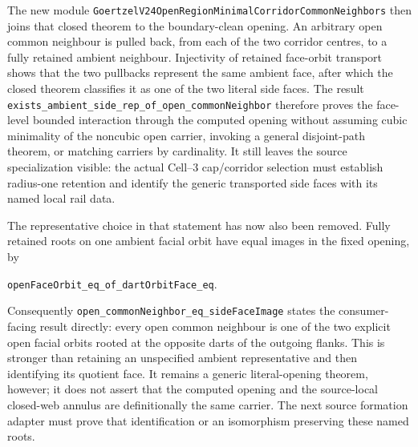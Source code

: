 \documentclass[11pt]{article}
\theoremstyle{definition}
\begin{document}
The new module
\texttt{GoertzelV24OpenRegionMinimalCorridorCommonNeighbors} then joins that
closed theorem to the boundary-clean opening.  An arbitrary open common
neighbour is pulled back, from each of the two corridor centres, to a fully
retained ambient neighbour.  Injectivity of retained face-orbit transport
shows that the two pullbacks represent the same ambient face, after which the
closed theorem classifies it as one of the two literal side faces.  The result
\texttt{exists\_ambient\_side\_rep\_of\_open\_commonNeighbor} therefore proves
the face-level bounded interaction through the computed opening without
assuming cubic minimality of the noncubic open carrier, invoking a general
disjoint-path theorem, or matching carriers by cardinality.  It still leaves
the source specialization visible: the actual Cell--3 cap/corridor selection
must establish radius-one retention and identify the generic transported
side faces with its named local rail data.

The representative choice in that statement has now also been removed.
Fully retained roots on one ambient facial orbit have equal images in the
fixed opening, by

\begin{center}
\texttt{openFaceOrbit\_eq\_of\_dartOrbitFace\_eq}.
\end{center}

Consequently \texttt{open\_commonNeighbor\_eq\_sideFaceImage} states the
consumer-facing result directly: every open common neighbour is one of the
two explicit open facial orbits rooted at the opposite darts of the outgoing
flanks.  This is stronger than retaining an unspecified ambient representative
and then identifying its quotient face.  It remains a generic literal-opening
theorem, however; it does not assert that the computed opening and the
source-local closed-web annulus are definitionally the same carrier.  The next
source formation adapter must prove that identification or an isomorphism
preserving these named roots.
\end{document}

